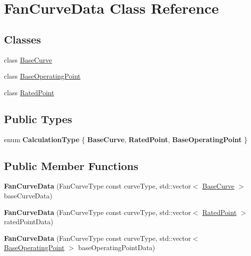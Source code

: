 \hypertarget{class_fan_curve_data}{}\section{Fan\+Curve\+Data Class Reference}
\label{class_fan_curve_data}
\subsection*{Classes}
\begin{DoxyCompactItemize}
\item 
class \hyperlink{class_fan_curve_data_1_1_base_curve}{Base\+Curve}
\item 
class \hyperlink{class_fan_curve_data_1_1_base_operating_point}{Base\+Operating\+Point}
\item 
class \hyperlink{class_fan_curve_data_1_1_rated_point}{Rated\+Point}
\end{DoxyCompactItemize}
\subsection*{Public Types}
\begin{DoxyCompactItemize}
\item 
\mbox{\label{class_fan_curve_data_af87fafad0a2a00e26ba82fb33b1a7282}} 
enum {\bfseries Calculation\+Type} \{ {\bfseries Base\+Curve}, 
{\bfseries Rated\+Point}, 
{\bfseries Base\+Operating\+Point}
 \}
\end{DoxyCompactItemize}
\subsection*{Public Member Functions}
\begin{DoxyCompactItemize}
\item 
\mbox{\label{class_fan_curve_data_a2419372103465feb9dca675d5391c489}} 
{\bfseries Fan\+Curve\+Data} (Fan\+Curve\+Type const curve\+Type, std\+::vector$<$ \hyperlink{class_fan_curve_data_1_1_base_curve}{Base\+Curve} $>$ base\+Curve\+Data)
\item 
\mbox{\label{class_fan_curve_data_aab50cc3aa6ac0208d02691af715d72bb}} 
{\bfseries Fan\+Curve\+Data} (Fan\+Curve\+Type const curve\+Type, std\+::vector$<$ \hyperlink{class_fan_curve_data_1_1_rated_point}{Rated\+Point} $>$ rated\+Point\+Data)
\item 
\mbox{\label{class_fan_curve_data_a06a924f8d9b61eabc3fcaf2b32fc9bff}} 
{\bfseries Fan\+Curve\+Data} (Fan\+Curve\+Type const curve\+Type, std\+::vector$<$ \hyperlink{class_fan_curve_data_1_1_base_operating_point}{Base\+Operating\+Point} $>$ base\+Operating\+Point\+Data)
\end{DoxyCompactItemize}
